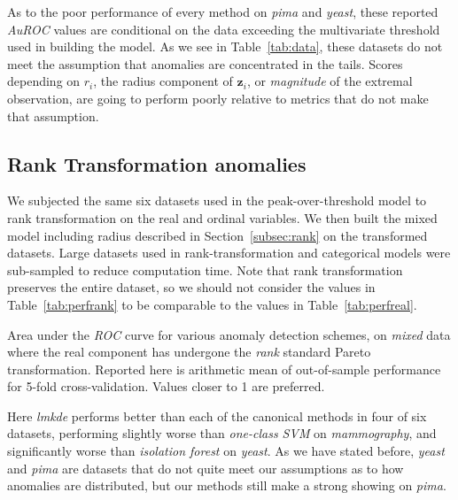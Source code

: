 As to the poor performance of every method on \emph{pima} and \emph{yeast}, 
    these reported \emph{AuROC} values are conditional on the data exceeding 
    the multivariate threshold used in building the model.  As we see in 
    Table~\ref{tab:data}, these datasets do not meet the assumption that 
    anomalies are concentrated in the tails.  Scores depending on $r_i$, the
    radius component of $\bm{z}_i$, or \emph{magnitude} of the extremal 
    observation, are going to perform poorly relative to metrics that do not 
    make that assumption.

\subsection{Rank Transformation anomalies}
We subjected the same six datasets used in the peak-over-threshold model to 
    rank transformation on the real and ordinal variables. We then built the 
    mixed model including radius described in Section~\ref{subsec:rank} on the 
    transformed datasets.  Large datasets used in rank-transformation and 
    categorical models were sub-sampled to reduce computation time. 
    Note that rank transformation preserves the entire dataset, so we should 
    not consider the values in Table~\ref{tab:perfrank} to be comparable to 
    the values in Table~\ref{tab:perfreal}.
    
\begin{table}[ht]
    \centering
    \caption{Area under the \emph{ROC} curve for various anomaly detection 
        schemes, on \emph{mixed} data where the real component has undergone 
        the \emph{rank} standard Pareto transformation. Reported here is 
        arithmetic mean of out-of-sample performance for 5-fold 
        cross-validation.  Values closer to 1 are preferred.
        \label{tab:perfrank}}
    \small
    \bigskip
    
\end{table}

Here \emph{lmkde} performs better than each of the canonical methods in four of 
    six datasets, performing slightly worse than \emph{one-class SVM} on 
    \emph{mammography}, and significantly worse than \emph{isolation forest} on 
    \emph{yeast}.  As we have stated before, \emph{yeast} and \emph{pima} are 
    datasets that do not quite meet our assumptions as to how anomalies are 
    distributed, but our methods still make a strong showing on \emph{pima}.
    

